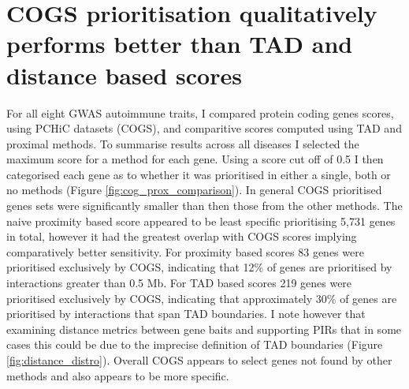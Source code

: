 \documentclass[a4paper,11pt]{report}
\begin{document}
\section{COGS prioritisation qualitatively performs better than TAD and distance based scores}
For all eight GWAS autoimmune traits, I compared protein coding genes scores, using PCHiC datasets (COGS), and comparitive scores computed using TAD and proximal methods. To summarise results across all diseases I selected the maximum score for a method for each gene. Using a score cut off of 0.5 I then categorised each gene as to whether it was prioritised in either a single, both or no methods (Figure \ref{fig:cog_prox_comparison}). In general COGS prioritised genes sets were significantly smaller than then those from the other methods. The naive proximity based score appeared to be least specific prioritising 5,731 genes in total, however it had the greatest overlap with COGS scores implying comparatively better sensitivity. For proximity based scores 83 genes were prioritised exclusively by COGS, indicating that 12\% of genes are prioritised by interactions greater than 0.5 Mb. For TAD based scores 219 genes were prioritised exclusively by COGS, indicating that approximately 30\% of genes are prioritised by interactions that span TAD boundaries.  I note however that examining distance metrics between gene baits and supporting PIRs that in some cases this could be due to the imprecise definition of TAD boundaries (Figure \ref{fig:distance_distro}). Overall COGS appears to select genes not found by other methods and also appears to be more specific.
\end{document}
